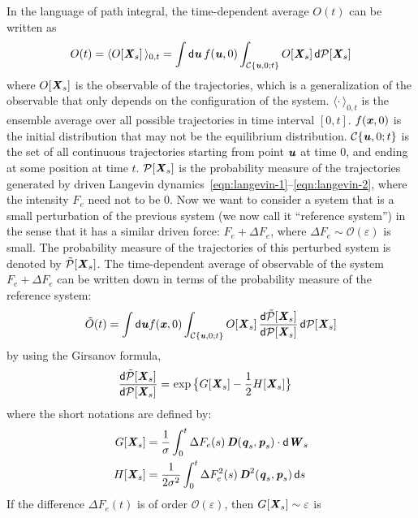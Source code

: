 \documentclass[aip,jcp,a4paper,reprint,onecolumn]{revtex4-1}
\newcommand{\vect}[1]{\textbf{\textit{#1}}}
\newcommand{\dd}{\textsf{d}}
\newcommand{\mo}{\mathcal O}
\newcommand{\mc}{\mathcal C}
\begin{document}
In the language of path integral, the time-dependent average $O( t)$
can be written as
\begin{align}
  O( t) =
  \langle O[\vect X_s]\,\rangle_{0,t} = 
  \int\dd \vect u\, f(\vect u, 0) 
  \int_{\mc\{\vect u,0; t\}}
  O[\vect X_s]\, \dd\mathcal P[\vect X_s]  
\end{align}
where $O[\vect X_s]$ is the observable of the trajectories, which is a generalization of the
observable that only depends on the configuration of the system.
$\langle \cdot \,\rangle_{0,t}$ is the ensemble average over all possible trajectories in time interval $[0,t]$.
$f(\vect x, 0)$ is the initial distribution that may not be the equilibrium distribution.
$\mc\{\vect u,0; t\}$ is the set of all continuous trajectories starting from point
$\vect u$ at time $0$, and ending at some position at time $t$.
$\mathcal P[\vect X_s]$ is the
probability measure of the trajectories generated by driven Langevin dynamics~\eqref{eqn:langevin-1}--\eqref{eqn:langevin-2},
where the intensity $F_e$ need not to be 0.
Now we want to consider a system that is a small perturbation of the previous system (we now call it ``reference system'')
in the sense that it has a similar driven force: $F_e + \Delta F_e$, where $\Delta F_e\sim \mo(\varepsilon)$ is small.
The probability measure of the trajectories of this perturbed system is denoted by
$\tilde{\mathcal P}[\vect X_s]$.
The time-dependent average of observable of the system $F_e + \Delta F_e$ can be written down in terms of
the probability measure of the reference system:
\begin{align}
  \tilde O(t) =
  \int \dd\vect u f(\vect x,0)
  \int_{\mc\{\vect u,0; t\}} O[\vect X_s]\,
  \frac{\dd\tilde{\mathcal P}[\vect X_s]}{\dd\mathcal P[\vect X_s]}
  \, \dd\mathcal P[\vect X_s]    
\end{align}
by using the Girsanov formula, 
\begin{align}\label{eqn:girsanov}
  \frac
  {\dd\tilde{\mathcal P}[\vect X_s]}
  {\dd\mathcal P[\vect X_s]}  
  =&\,
  \exp
  \big\{{G[\vect X_s] - \frac12 H[\vect X_s]}
  \big\}
\end{align}
where the short notations are defined by:
\begin{align}
  G[\vect X_s]
  &= \frac{1}\sigma\int_0^t
  \Delta F_e(s)\,\vect D(\vect q_s,\vect p_s)\cdot\dd\vect W_s \\
  H[\vect X_s]
  &=
  \frac 1{2\sigma^2}\int_0^t
  \Delta F_e^2(s)\,\vect D^2(\vect q_s,\vect p_s)\,\dd s
\end{align}
If the difference $\Delta F_e(t)$ is of order $\mo (\varepsilon)$, then $G[\vect X_s] \sim \varepsilon$ is
\end{document}
